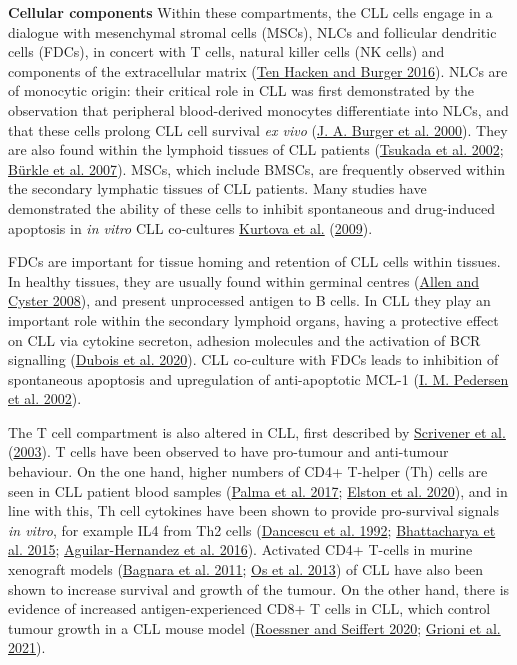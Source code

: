 \documentclass[11pt, a4paper, twosided]{book}
\begin{document}
\textbf{Cellular components}
Within these compartments, the CLL cells engage in a dialogue with mesenchymal stromal cells (MSCs), NLCs and follicular dendritic cells (FDCs), in concert with T cells, natural killer cells (NK cells) and components of the extracellular matrix (\protect\hyperlink{ref-tenHacken2016}{Ten Hacken and Burger 2016}). NLCs are of monocytic origin: their critical role in CLL was first demonstrated by the observation that peripheral blood-derived monocytes differentiate into NLCs, and that these cells prolong CLL cell survival \emph{ex vivo} (\protect\hyperlink{ref-Burger2000}{J. A. Burger et al. 2000}). They are also found within the lymphoid tissues of CLL patients (\protect\hyperlink{ref-Tsukada2002}{Tsukada et al. 2002}; \protect\hyperlink{ref-Burkle2007}{Bürkle et al. 2007}). MSCs, which include BMSCs, are frequently observed within the secondary lymphatic tissues of CLL patients. Many studies have demonstrated the ability of these cells to inhibit spontaneous and drug-induced apoptosis in \emph{in vitro} CLL co-cultures \protect\hyperlink{ref-Kurtova2009}{Kurtova et al.} (\protect\hyperlink{ref-Kurtova2009}{2009}).

FDCs are important for tissue homing and retention of CLL cells within tissues. In healthy tissues, they are usually found within germinal centres (\protect\hyperlink{ref-Allen2008}{Allen and Cyster 2008}), and present unprocessed antigen to B cells. In CLL they play an important role within the secondary lymphoid organs, having a protective effect on CLL via cytokine secreton, adhesion molecules and the activation of BCR signalling (\protect\hyperlink{ref-Dubois2020}{Dubois et al. 2020}). CLL co-culture with FDCs leads to inhibition of spontaneous apoptosis and upregulation of anti-apoptotic MCL-1 (\protect\hyperlink{ref-Pedersen2002}{I. M. Pedersen et al. 2002}).

The T cell compartment is also altered in CLL, first described by \protect\hyperlink{ref-Scrivener2003}{Scrivener et al.} (\protect\hyperlink{ref-Scrivener2003}{2003}). T cells have been observed to have pro-tumour and anti-tumour behaviour. On the one hand, higher numbers of CD4+ T-helper (Th) cells are seen in CLL patient blood samples (\protect\hyperlink{ref-Palma2017}{Palma et al. 2017}; \protect\hyperlink{ref-Elston2020}{Elston et al. 2020}), and in line with this, Th cell cytokines have been shown to provide pro-survival signals \emph{in vitro}, for example IL4 from Th2 cells (\protect\hyperlink{ref-Dancescu1992}{Dancescu et al. 1992}; \protect\hyperlink{ref-Bhattacharya2015}{Bhattacharya et al. 2015}; \protect\hyperlink{ref-AguilarHernandez2016}{Aguilar-Hernandez et al. 2016}). Activated CD4+ T-cells in murine xenograft models (\protect\hyperlink{ref-Bagnara2011}{Bagnara et al. 2011}; \protect\hyperlink{ref-Os2013}{Os et al. 2013}) of CLL have also been shown to increase survival and growth of the tumour. On the other hand, there is evidence of increased antigen-experienced CD8+ T cells in CLL, which control tumour growth in a CLL mouse model (\protect\hyperlink{ref-Roessner2020}{Roessner and Seiffert 2020}; \protect\hyperlink{ref-Grioni2021}{Grioni et al. 2021}).
\end{document}
